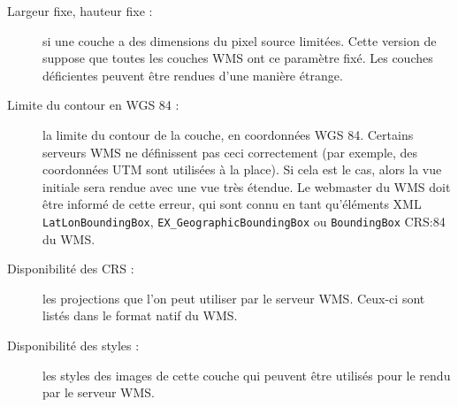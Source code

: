 \begin{itemize}[label=--]
\begin{description}
\item[Largeur fixe, hauteur fixe :]  si une couche a des dimensions du pixel source limitées. Cette version de \qg suppose que toutes les couches WMS ont ce paramètre fixé. Les couches déficientes peuvent être rendues d'une manière étrange.

\item[Limite du contour en WGS 84 :]  la limite du contour de la couche, en coordonnées WGS 84. Certains serveurs WMS ne définissent pas ceci correctement (par exemple, des coordonnées UTM sont utilisées à la place). Si cela est le cas, alors la vue initiale sera rendue avec une vue très étendue. Le webmaster du WMS doit être informé de cette erreur, qui sont connu en tant qu'éléments XML \texttt{LatLonBoundingBox}, \texttt{EX\_GeographicBoundingBox} ou \texttt{BoundingBox} CRS:84 du WMS.

\item[Disponibilité des CRS :]  les projections que l'on peut utiliser
par le serveur WMS. Ceux-ci sont listés dans le format natif du WMS.

\item[Disponibilité des styles :]  les styles des images de cette couche
qui peuvent être utilisés pour le rendu par le serveur WMS.

\end{description}

\end{itemize}


